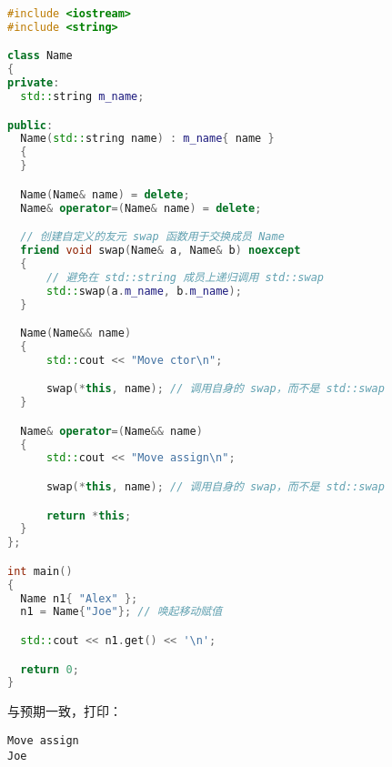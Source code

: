 \documentclass[../../LearnCpp.tex]{subfiles}
\begin{document}
\begin{lstlisting}[language=C++]
#include <iostream>
#include <string>

class Name
{
private:
  std::string m_name;

public:
  Name(std::string name) : m_name{ name }
  {
  }

  Name(Name& name) = delete;
  Name& operator=(Name& name) = delete;

  // 创建自定义的友元 swap 函数用于交换成员 Name
  friend void swap(Name& a, Name& b) noexcept
  {
      // 避免在 std::string 成员上递归调用 std::swap
      std::swap(a.m_name, b.m_name);
  }

  Name(Name&& name)
  {
      std::cout << "Move ctor\n";

      swap(*this, name); // 调用自身的 swap，而不是 std::swap
  }

  Name& operator=(Name&& name)
  {
      std::cout << "Move assign\n";

      swap(*this, name); // 调用自身的 swap，而不是 std::swap

      return *this;
  }
};

int main()
{
  Name n1{ "Alex" };
  n1 = Name{"Joe"}; // 唤起移动赋值

  std::cout << n1.get() << '\n';

  return 0;
}
\end{lstlisting}

与预期一致，打印：

\begin{lstlisting}
Move assign
Joe
\end{lstlisting}
\end{document}
